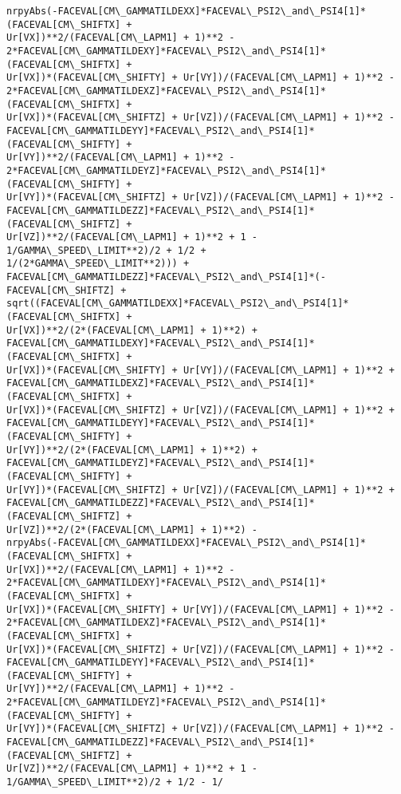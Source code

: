 \documentclass[landscape,letterpaper,10pt,english]{article}
\begin{document}
\begin{Verbatim}[commandchars=\\\{\}]
nrpyAbs(-FACEVAL[CM\_GAMMATILDEXX]*FACEVAL\_PSI2\_and\_PSI4[1]*(FACEVAL[CM\_SHIFTX] +
Ur[VX])**2/(FACEVAL[CM\_LAPM1] + 1)**2 -
2*FACEVAL[CM\_GAMMATILDEXY]*FACEVAL\_PSI2\_and\_PSI4[1]*(FACEVAL[CM\_SHIFTX] +
Ur[VX])*(FACEVAL[CM\_SHIFTY] + Ur[VY])/(FACEVAL[CM\_LAPM1] + 1)**2 -
2*FACEVAL[CM\_GAMMATILDEXZ]*FACEVAL\_PSI2\_and\_PSI4[1]*(FACEVAL[CM\_SHIFTX] +
Ur[VX])*(FACEVAL[CM\_SHIFTZ] + Ur[VZ])/(FACEVAL[CM\_LAPM1] + 1)**2 -
FACEVAL[CM\_GAMMATILDEYY]*FACEVAL\_PSI2\_and\_PSI4[1]*(FACEVAL[CM\_SHIFTY] +
Ur[VY])**2/(FACEVAL[CM\_LAPM1] + 1)**2 -
2*FACEVAL[CM\_GAMMATILDEYZ]*FACEVAL\_PSI2\_and\_PSI4[1]*(FACEVAL[CM\_SHIFTY] +
Ur[VY])*(FACEVAL[CM\_SHIFTZ] + Ur[VZ])/(FACEVAL[CM\_LAPM1] + 1)**2 -
FACEVAL[CM\_GAMMATILDEZZ]*FACEVAL\_PSI2\_and\_PSI4[1]*(FACEVAL[CM\_SHIFTZ] +
Ur[VZ])**2/(FACEVAL[CM\_LAPM1] + 1)**2 + 1 - 1/GAMMA\_SPEED\_LIMIT**2)/2 + 1/2 +
1/(2*GAMMA\_SPEED\_LIMIT**2))) +
FACEVAL[CM\_GAMMATILDEZZ]*FACEVAL\_PSI2\_and\_PSI4[1]*(-FACEVAL[CM\_SHIFTZ] +
sqrt((FACEVAL[CM\_GAMMATILDEXX]*FACEVAL\_PSI2\_and\_PSI4[1]*(FACEVAL[CM\_SHIFTX] +
Ur[VX])**2/(2*(FACEVAL[CM\_LAPM1] + 1)**2) +
FACEVAL[CM\_GAMMATILDEXY]*FACEVAL\_PSI2\_and\_PSI4[1]*(FACEVAL[CM\_SHIFTX] +
Ur[VX])*(FACEVAL[CM\_SHIFTY] + Ur[VY])/(FACEVAL[CM\_LAPM1] + 1)**2 +
FACEVAL[CM\_GAMMATILDEXZ]*FACEVAL\_PSI2\_and\_PSI4[1]*(FACEVAL[CM\_SHIFTX] +
Ur[VX])*(FACEVAL[CM\_SHIFTZ] + Ur[VZ])/(FACEVAL[CM\_LAPM1] + 1)**2 +
FACEVAL[CM\_GAMMATILDEYY]*FACEVAL\_PSI2\_and\_PSI4[1]*(FACEVAL[CM\_SHIFTY] +
Ur[VY])**2/(2*(FACEVAL[CM\_LAPM1] + 1)**2) +
FACEVAL[CM\_GAMMATILDEYZ]*FACEVAL\_PSI2\_and\_PSI4[1]*(FACEVAL[CM\_SHIFTY] +
Ur[VY])*(FACEVAL[CM\_SHIFTZ] + Ur[VZ])/(FACEVAL[CM\_LAPM1] + 1)**2 +
FACEVAL[CM\_GAMMATILDEZZ]*FACEVAL\_PSI2\_and\_PSI4[1]*(FACEVAL[CM\_SHIFTZ] +
Ur[VZ])**2/(2*(FACEVAL[CM\_LAPM1] + 1)**2) -
nrpyAbs(-FACEVAL[CM\_GAMMATILDEXX]*FACEVAL\_PSI2\_and\_PSI4[1]*(FACEVAL[CM\_SHIFTX] +
Ur[VX])**2/(FACEVAL[CM\_LAPM1] + 1)**2 -
2*FACEVAL[CM\_GAMMATILDEXY]*FACEVAL\_PSI2\_and\_PSI4[1]*(FACEVAL[CM\_SHIFTX] +
Ur[VX])*(FACEVAL[CM\_SHIFTY] + Ur[VY])/(FACEVAL[CM\_LAPM1] + 1)**2 -
2*FACEVAL[CM\_GAMMATILDEXZ]*FACEVAL\_PSI2\_and\_PSI4[1]*(FACEVAL[CM\_SHIFTX] +
Ur[VX])*(FACEVAL[CM\_SHIFTZ] + Ur[VZ])/(FACEVAL[CM\_LAPM1] + 1)**2 -
FACEVAL[CM\_GAMMATILDEYY]*FACEVAL\_PSI2\_and\_PSI4[1]*(FACEVAL[CM\_SHIFTY] +
Ur[VY])**2/(FACEVAL[CM\_LAPM1] + 1)**2 -
2*FACEVAL[CM\_GAMMATILDEYZ]*FACEVAL\_PSI2\_and\_PSI4[1]*(FACEVAL[CM\_SHIFTY] +
Ur[VY])*(FACEVAL[CM\_SHIFTZ] + Ur[VZ])/(FACEVAL[CM\_LAPM1] + 1)**2 -
FACEVAL[CM\_GAMMATILDEZZ]*FACEVAL\_PSI2\_and\_PSI4[1]*(FACEVAL[CM\_SHIFTZ] +
Ur[VZ])**2/(FACEVAL[CM\_LAPM1] + 1)**2 + 1 - 1/GAMMA\_SPEED\_LIMIT**2)/2 + 1/2 - 1/

\end{Verbatim}
\end{document}
